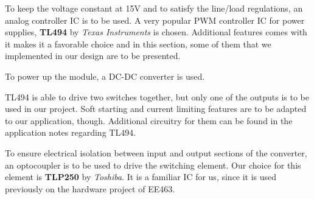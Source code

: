 To keep the voltage constant at 15V and to satisfy the line/load regulations, an analog controller IC is to be used. A very popular PWM controller IC for power supplies, \textbf{TL494} by \emph{Texas Instruments} is chosen. Additional features comes with it makes it a favorable choice and in this section, some of them that we implemented in our design are to be presented.

To power up the module, a DC-DC converter is used. 


TL494 is able to drive two switches together, but only one of the outputs is to be used in our project. Soft starting and current limiting features are to be adapted to our application, though. Additional circuitry for them can be found in the application notes regarding TL494. 

To ensure electrical isolation between input and output sections of the converter, an optocoupler is to be used to drive the switching element. Our choice for this element is \textbf{TLP250} by \emph{Toshiba}. It is a familiar IC for us, since it is used previously on the hardware project of EE463.